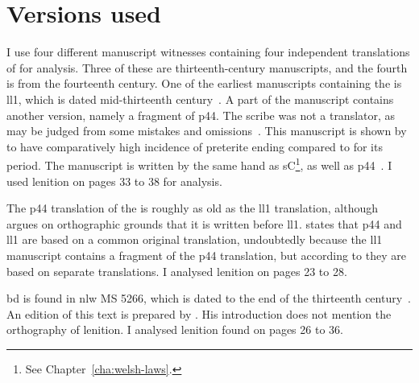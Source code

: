 \section{Versions used}
I use four different manuscript witnesses containing four independent translations of  for analysis.
Three of these are thirteenth-century manuscripts, and the fourth is from the fourteenth century.
One of the earliest manuscripts containing the  is \acrfull{ll1}, which
is dated mid-thirteenth century~\autocite[179]{huws_medieval_2000}.  A part of
the manuscript contains another version, namely a fragment
of \gls{p44}. The scribe was not a translator, as may be judged from
some mistakes and omissions~\autocite[xxxvii]{roberts_brut_1971}. This manuscript is shown by \textcite[80--81]{Rod_Datable98} to have comparatively high incidence of preterite ending  compared to  for its period.
The manuscript is written by the same hand as \gls{sC}\footnote{See Chapter~\ref{cha:welsh-laws}.}, as well as  \gls{p44}~\autocite[179]{huws_medieval_2000}.
I used lenition on pages 33 to 38 for analysis.

The \acrfull{p44} translation of the  is roughly as old as the \gls{ll1} translation, although \textcite[85]{Rus_Orthography93} argues on orthographic grounds that it is written before \gls{ll1}. 
\Textcite[xix]{Lew_Brut42} states that \gls{p44} and \gls{ll1} are based on a common original translation, undoubtedly because the \gls{ll1} manuscript contains a fragment of the \gls{p44} translation, but according to \textcite[xliii--xliv]{Rob_Astudiaeth69}  they are based on separate translations.
I analysed lenition on pages 23 to 28.

\Acrfull{bd} is found in \gls{nlw} MS 5266, which  is dated to the end of the thirteenth century~\autocite[xliii]{Rob_Astudiaeth69}.
An edition of this text is prepared by \textcite{Lew_Brut42}.
His introduction does not mention the orthography of lenition.
I analysed lenition found on pages 26 to 36.

